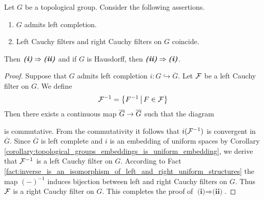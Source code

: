 \documentclass[10pt]{amsart}
\begin{document}
\begin{theorem}\label{theorem:criterion_for_existence_of_one_sided_completions}
	Let $G$ be a topological group. Consider the following assertions.
	\begin{enumerate}[label=\emph{\textbf{(\roman*)}}, leftmargin=*]
		\item $G$ admits left completion.
		\item Left Cauchy filters and right Cauchy filters on $G$ coincide.
	\end{enumerate}
	Then $\emph{\textbf{(i)}} \Rightarrow \emph{\textbf{(ii)}}$ and if $G$ is Hausdorff, then $\emph{\textbf{(ii)}} \Rightarrow \emph{\textbf{(i)}}$.
\end{theorem}
\begin{proof}
	Suppose that $G$ admits left completion $i:G \hookrightarrow \overline{G}$. Let ${\mathcal F}$ be a left Cauchy filter on $G$. We define
	$${\mathcal F}^{-1} = \big\{F^{-1}\,\big|\,F\in {\mathcal F}\big\}$$
	Then there exists a continuous map $\overline{G}\rightarrow \overline{G}$ such that the diagram
	\begin{center}
	\end{center}
	is commutative. From the commutativity it follows that $i({\mathcal F}^{-1})$ is convergent in $\overline{G}$. Since $\overline{G}$ is left complete and $i$ is an embedding of uniform spaces by Corollary \ref{corollary:topological_groups_embeddings_is_uniform_embedding}, we derive that ${\mathcal F}^{-1}$ is a left Cauchy filter on $G$. According to Fact \ref{fact:inverse_is_an_isomorphism_of_left_and_right_uniform_structures} the map $(-)^{-1}$ induces bijection between left and right Cauchy filters on $G$. Thus ${\mathcal F}$ is a right Cauchy filter on $G$. This completes the proof of $\textbf{(i)}\Rightarrow \textbf{(ii)}$.


\end{proof}
\end{document}
